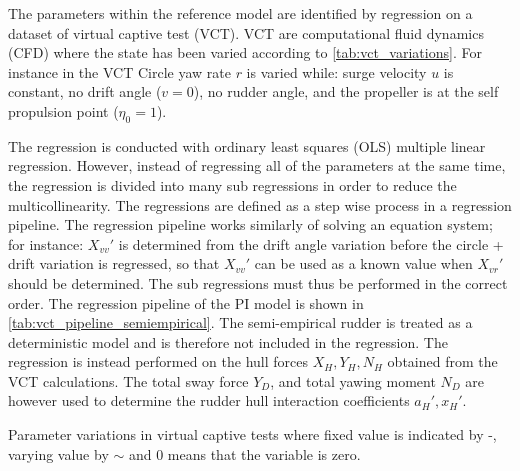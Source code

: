 The parameters within the reference model are identified by regression on a dataset \citep{marimon_giovannetti_effects_2020} of virtual captive test (VCT). VCT are computational fluid dynamics (CFD) where the state has been varied according to \autoref{tab:vct_variations}. For instance in the VCT Circle yaw rate $r$ is varied while: surge velocity $u$ is constant, no drift angle ($v=0$), no rudder angle, and the propeller is at the self propulsion point ($\eta_0=1$).

The regression is conducted with ordinary least squares (OLS) multiple linear regression. However, instead of regressing all of the parameters at the same time, the regression is divided into many sub regressions in order to reduce the multicollinearity. The regressions are defined as a step wise process in a regression pipeline. 
The regression pipeline works similarly of solving an equation system; for instance: ${X_{vv}}'$ is determined from the drift angle variation before the circle + drift variation is regressed, so that ${X_{vv}}'$ can be used as a known value when ${X_{vr}}'$ should be determined. The sub regressions must thus be performed in the correct order. 
The regression pipeline of the PI model is shown in \autoref{tab:vct_pipeline_semiempirical}. The semi-empirical rudder is treated as a deterministic model and is therefore not included in the regression. The regression is instead performed on the hull forces $X_H,Y_H,N_H$ obtained from the VCT calculations. The total sway force $Y_D$, and total yawing moment $N_D$ are however used to determine the rudder hull interaction coefficients ${a_H}',{x_H}'$. 
\begin{table}[h!]
    \centering
    \caption{Parameter variations in virtual captive tests where fixed value is indicated by -, varying value by $\sim$ and 0 means that the variable is zero.}
    \label{tab:vct_variations}
\end{table}
